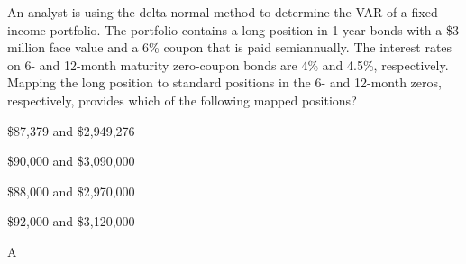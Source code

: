 \documentclass{article}
\newcounter{question} %
\begin{document}
\begin{question}
    An analyst is using the delta-normal method to determine the VAR of a fixed income portfolio. The portfolio contains a long position in 1-year bonds with a \$3 million face value and a 6\% coupon that is paid semiannually. The interest rates on 6- and 12-month maturity zero-coupon bonds are 4\% and 4.5\%, respectively. Mapping the long position to standard positions in the 6- and 12-month zeros, respectively, provides which of the following mapped positions?
\end{question}

\begin{choices}
    \item \$87,379 and \$2,949,276
    \item \$90,000 and \$3,090,000
    \item \$88,000 and \$2,970,000
    \item \$92,000 and \$3,120,000
\end{choices}

\begin{correctanswer}
    A
\end{correctanswer}
\end{document}
